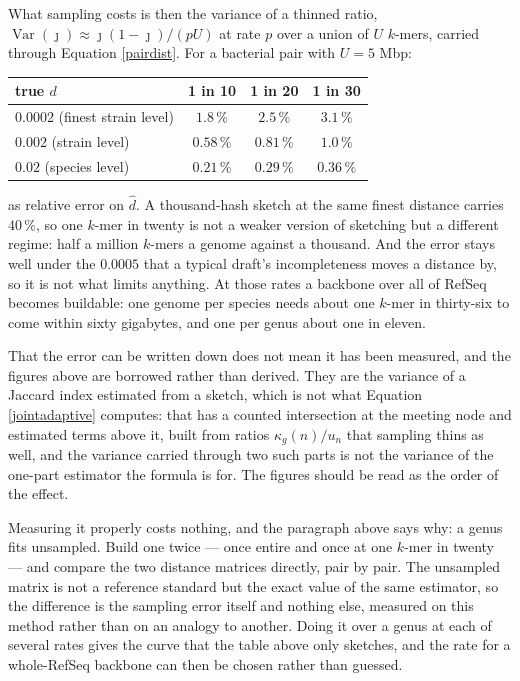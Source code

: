 \documentclass[pdflatex,sn-vancouver-num]{sn-jnl}
\begin{document}
What sampling costs is then the variance of a thinned ratio,
$\operatorname{Var}(\widehat{\jmath}) \approx \jmath(1-\jmath)/(pU)$ at rate $p$ over a union of $U$
$k$-mers, carried through Equation \eqref{pairdist}. For a bacterial pair with $U = 5$ Mbp:

\begin{center}\footnotesize
\begin{tabular}{@{}l|c|c|c@{}}
 \textbf{true $d$} & \textbf{1 in 10} & \textbf{1 in 20} & \textbf{1 in 30}\\
 \hline
 $0.0002$ \quad (finest strain level) & $1.8\,\%$ & $2.5\,\%$ & $3.1\,\%$\\
 $0.002$ \quad (strain level)         & $0.58\,\%$ & $0.81\,\%$ & $1.0\,\%$\\
 $0.02$ \quad (species level)         & $0.21\,\%$ & $0.29\,\%$ & $0.36\,\%$\\
\end{tabular}
\end{center}

\noindent
as relative error on $\widehat{d}$. A thousand-hash sketch at the same finest distance carries
$40\,\%$, so one $k$-mer in twenty is not a weaker version of sketching but a different regime: half a
million $k$-mers a genome against a thousand. And the error stays well under the $0.0005$ that a
typical draft's incompleteness moves a distance by, so it is not what limits anything. At those rates a
backbone over all of RefSeq becomes buildable: one genome per species needs about one $k$-mer in
thirty-six to come within sixty gigabytes, and one per genus about one in eleven.

That the error can be written down does not mean it has been measured, and the figures above are
borrowed rather than derived. They are the variance of a Jaccard index estimated from a sketch, which
is not what Equation \eqref{jointadaptive} computes: that has a counted intersection at the meeting
node and estimated terms above it, built from ratios $\kappa_g(n)/u_n$ that sampling thins as well,
and the variance carried through two such parts is not the variance of the one-part estimator the
formula is for. The figures should be read as the order of the effect.

Measuring it properly costs nothing, and the paragraph above says why: a genus fits unsampled. Build
one twice --- once entire and once at one $k$-mer in twenty --- and compare the two distance matrices
directly, pair by pair. The unsampled matrix is not a reference standard but the exact value of the
same estimator, so the difference is the sampling error itself and nothing else, measured on this
method rather than on an analogy to another. Doing it over a genus at each of several rates gives the
curve that the table above only sketches, and the rate for a whole-RefSeq backbone can then be chosen
rather than guessed.
\end{document}
